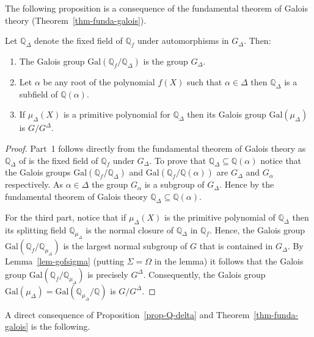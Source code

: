 \documentclass[prodmod,acmtalg]{acmsmall}
\newcommand{\Gal}[1]{{\ensuremath{\mathrm{Gal}\left(#1\right)}}}
\newcommand{\Q}{\ensuremath{\mathbb{Q}}}
\begin{document}
The following proposition is a consequence of the fundamental theorem
of Galois theory (Theorem~\ref{thm-funda-galois}).

\begin{proposition}\label{prop-Q-delta}
  Let $\Q_\Delta$ denote the fixed field of $\Q_f$ under automorphisms
  in $G_\Delta$. Then:
  \begin{enumerate}
  \item The Galois group $\Gal{\Q_f/\Q_{\Delta}}$ is the group $G_\Delta$.
  \item Let $\alpha$ be any root of the polynomial $f(X)$ such that
    $\alpha \in \Delta$ then $\Q_{\Delta}$ is a subfield of
    $\Q(\alpha)$.
  \item If $\mu_{\Delta}(X)$ is a primitive polynomial for
    $\Q_{\Delta}$ then its Galois group $\Gal{\mu_\Delta}$ is
    $G/G^{\Delta}$.
  \end{enumerate}
\end{proposition}
\begin{proof}
  Part~1 follows directly from the fundamental theorem of Galois
  theory as $\Q_{\Delta}$ of is the fixed field of $\Q_f$ under
  $G_\Delta$. To prove that $\Q_\Delta \subseteq \Q(\alpha)$ notice
  that the Galois groups $\Gal{\Q_f/\Q_{\Delta}}$ and
  $\Gal{\Q_f/\Q(\alpha)}$ are $G_\Delta$ and $G_\alpha$
  respectively. As $\alpha \in \Delta$ the group $G_\alpha$ is a
  subgroup of $G_\Delta$. Hence by the fundamental theorem of Galois
  theory $\Q_\Delta \subseteq \Q(\alpha)$.

For the third part, notice that if $\mu_{\Delta}(X)$ is the primitive
polynomial of $\Q_{\Delta}$ then its splitting field $\Q_{\mu_\Delta}$
is the normal closure of $\Q_\Delta$ in $\Q_f$. Hence, the Galois
group $\Gal{\Q_f/\Q_{\mu_\Delta}}$ is the largest normal subgroup of
$G$ that is contained in $G_{\Delta}$. By Lemma~\ref{lem-gofsigma}
(putting $\Sigma = \Omega$ in the lemma) it follows that the Galois
group $\Gal{\Q_f/\Q_{\mu_\Delta}}$ is precisely
$G^{\Delta}$. Consequently, the Galois group $\Gal{\mu_\Delta} =
\Gal{\Q_{\mu_\Delta}/\Q}$ is $G/G^\Delta$.
\end{proof}

A direct consequence of Proposition~\ref{prop-Q-delta} and
Theorem~\ref{thm-funda-galois} is the following.
\end{document}
